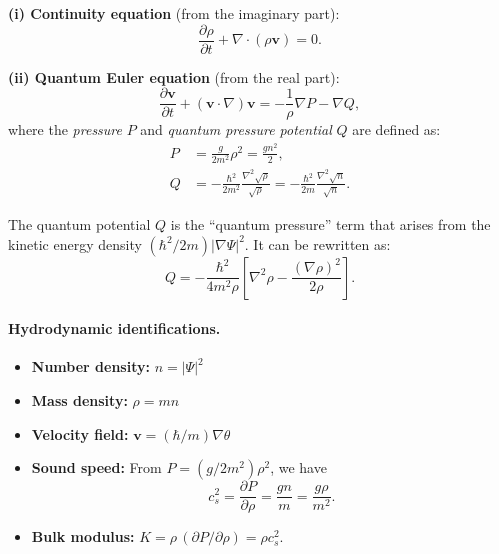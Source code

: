 \textbf{(i) Continuity equation} (from the imaginary part):
\begin{equation}
\label{eq:continuity}
\boxed{\frac{\partial \rho}{\partial t} + \nabla \cdot (\rho \mathbf{v}) = 0.}
\end{equation}

\textbf{(ii) Quantum Euler equation} (from the real part):
\begin{equation}
\label{eq:Euler}
\boxed{\frac{\partial \mathbf{v}}{\partial t} + (\mathbf{v} \cdot \nabla) \mathbf{v} = -\frac{1}{\rho} \nabla P - \nabla Q,}
\end{equation}
where the \emph{pressure} $P$ and \emph{quantum pressure potential} $Q$ are defined as:
\begin{align}
\label{eq:pressure}
P &= \frac{g}{2m^2} \rho^2 = \frac{g n^2}{2}, \\
\label{eq:quantum_potential}
Q &= -\frac{\hbar^2}{2m^2} \frac{\nabla^2 \sqrt{\rho}}{\sqrt{\rho}} = -\frac{\hbar^2}{2m} \frac{\nabla^2 \sqrt{n}}{\sqrt{n}}.
\end{align}

The quantum potential $Q$ is the ``quantum pressure'' term that arises from the kinetic energy density $(\hbar^2/2m)|\nabla\Psi|^2$. It can be rewritten as:
\begin{equation}
\label{eq:quantum_potential_alt}
Q = -\frac{\hbar^2}{4m^2\rho} \left[ \nabla^2 \rho - \frac{(\nabla \rho)^2}{2\rho} \right].
\end{equation}

\paragraph{Hydrodynamic identifications.}
\begin{itemize}[leftmargin=1.8em]
    \item \textbf{Number density:} $n = |\Psi|^2$
    \item \textbf{Mass density:} $\rho = mn$
    \item \textbf{Velocity field:} $\mathbf{v} = (\hbar/m) \nabla\theta$
    \item \textbf{Sound speed:} From $P = (g/2m^2)\rho^2$, we have
    \begin{equation}
    \label{eq:sound_speed}
    c_s^2 = \frac{\partial P}{\partial \rho} = \frac{g n}{m} = \frac{g \rho}{m^2}.
    \end{equation}
    \item \textbf{Bulk modulus:} $K = \rho \, (\partial P / \partial \rho) = \rho c_s^2$.
\end{itemize}

